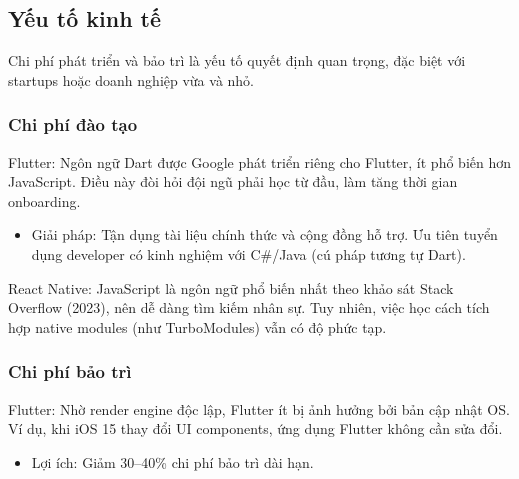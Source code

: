 \subsection{Yếu tố kinh tế}
\renewcommand{\labelitemi}{--}    
    \begin{flushleft}
        \hspace*{0.8cm}Chi phí phát triển và bảo trì là yếu tố quyết định quan trọng, đặc biệt với startups hoặc doanh nghiệp vừa và nhỏ.
    \end{flushleft}

    \subsubsection{Chi phí đào tạo}
    \begin{flushleft}
      \hspace*{0.8cm}Flutter: Ngôn ngữ Dart được Google phát triển riêng cho Flutter, ít phổ biến hơn JavaScript. Điều này đòi hỏi đội ngũ phải học từ đầu, làm tăng thời gian onboarding.
      \setlength{\leftmargini}{1.5cm}
      \begin{itemize}
        \item Giải pháp: Tận dụng tài liệu chính thức và cộng đồng hỗ trợ. Ưu tiên tuyển dụng developer có kinh nghiệm với C\#/Java (cú pháp tương tự Dart).
      \end{itemize}
    \end{flushleft}

    \begin{flushleft}
      \hspace*{0.8cm}React Native: JavaScript là ngôn ngữ phổ biến nhất theo khảo sát Stack Overflow (2023), nên dễ dàng tìm kiếm nhân sự. Tuy nhiên, việc học cách tích hợp native modules (như TurboModules) vẫn có độ phức tạp.
    \end{flushleft}

    \subsubsection{Chi phí bảo trì}
    \begin{flushleft}
      \hspace*{0.8cm}Flutter: Nhờ render engine độc lập, Flutter ít bị ảnh hưởng bởi bản cập nhật OS. Ví dụ, khi iOS 15 thay đổi UI components, ứng dụng Flutter không cần sửa đổi.
      \setlength{\leftmargini}{1.5cm}
      \begin{itemize}
        \item Lợi ích: Giảm 30–40\% chi phí bảo trì dài hạn.
      \end{itemize}
    \end{flushleft}

